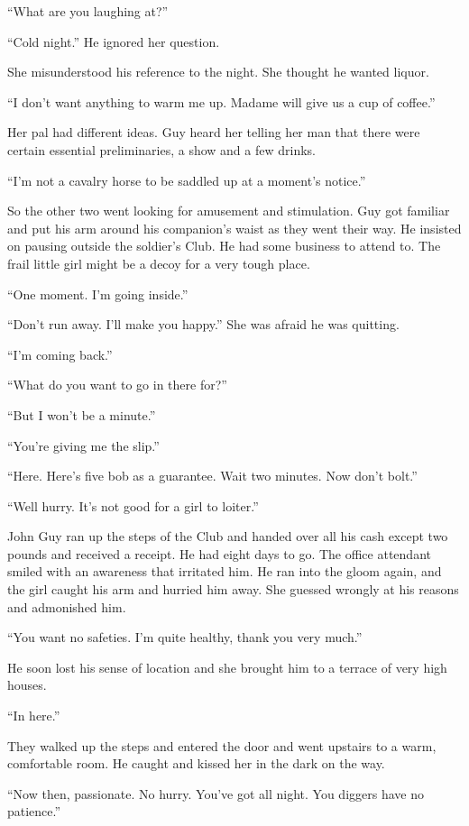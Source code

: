 ``What are you laughing at?''

``Cold night.'' He ignored her question.

She misunderstood his reference to the night. She thought he wanted liquor.

``I don't want anything to warm me up. Madame will give us a cup of coffee.''

Her pal had different ideas. Guy heard her telling her man that there were certain essential preliminaries, a show and a few drinks.

``I'm not a cavalry horse to be saddled up at a moment's notice.''

So the other two went looking for amusement and stimulation. Guy got familiar and put his arm around his companion's waist as they went their way. He insisted on pausing outside the soldier's Club. He had some business to attend to. The frail little girl might be a decoy for a very tough place.

``One moment. I'm going inside.''

``Don't run away. I'll make you happy.'' She was afraid he was quitting.

``I'm coming back.''

``What do you want to go in there for?''

``But I won't be a minute.''

``You're giving me the slip.''

``Here. Here's five bob as a guarantee. Wait two minutes. Now don't bolt.''

``Well hurry. It's not good for a girl to loiter.''

John Guy ran up the steps of the Club and handed over all his cash except two pounds and received a receipt. He had eight days to go. The office attendant smiled with an awareness that irritated him. He ran into the gloom again, and the girl caught his arm and hurried him away. She guessed wrongly at his reasons and admonished him.

``You want no safeties. I'm quite healthy, thank you very much.''

He soon lost his sense of location and she brought him to a terrace of very high houses.

``In here.''

They walked up the steps and entered the door and went upstairs to a warm, comfortable room. He caught and kissed her in the dark on the way.

``Now then, passionate. No hurry. You've got all night. You diggers have no patience.''

